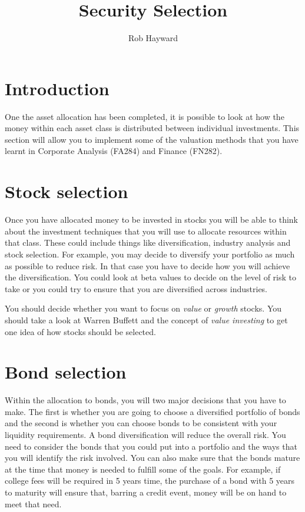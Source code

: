\documentclass[12pt, a4paper, oneside]{article}\usepackage[]{graphicx}\usepackage[]{color}
\begin{document}
\title{Security Selection}
\author{Rob Hayward}
\maketitle
\section{Introduction}
One the asset allocation has been completed, it is possible to look at how the money within each asset class is distributed between individual investments.  This section will allow you to implement some of the valuation methods that you have learnt in Corporate Analysis (FA284) and Finance (FN282).  

\section{Stock selection}
Once you have allocated money to be invested in stocks you will be able to think about the investment techniques that you will use to allocate resources within that class.  These could include things like diversification, industry analysis and stock selection.  For example, you may decide to diversify your portfolio as much as possible to reduce risk.  In that case you have to decide how you will achieve the diversification.  You could look at beta values to decide on the level of risk to take or you could try to ensure that you are diversified across industries.  

You should decide whether you want to focus on \emph{value} or \emph{growth} stocks.  You should take a look at Warren Buffett and the concept of \emph{value investing} to get one idea of how stocks should be selected. 

\section*{Bond selection}
Within the allocation to bonds, you will two major decisions that you have to make.  The first is whether you are going to choose a diversified portfolio of bonds and the second is whether you can choose bonds to be consistent with your liquidity requirements.  A bond diversification will reduce the overall risk.  You need to consider the bonds that you could put into a portfolio and the ways that you will identify the risk involved. You can also make sure that the bonds mature at the time that money is needed to fulfill some of the goals.  For example, if college fees will be required in 5 years time, the purchase of a bond with 5 years to maturity will ensure that, barring a credit event, money will be on hand to meet that need.  
\end{document}

